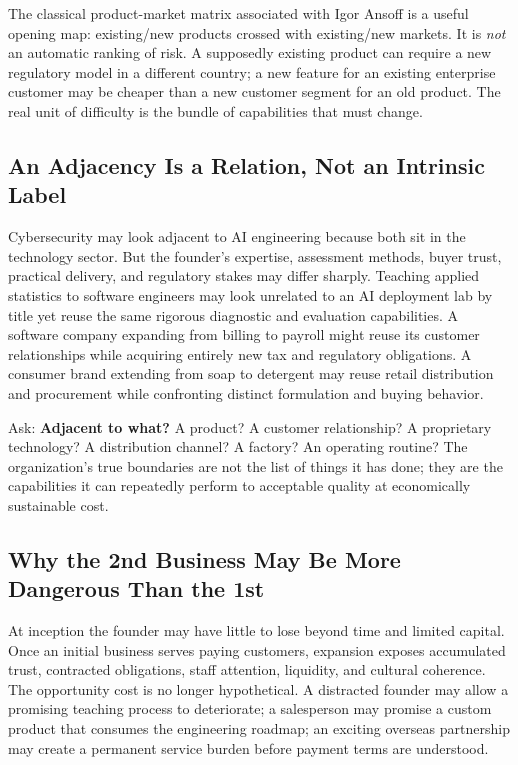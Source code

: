 The classical product-market matrix associated with Igor Ansoff is a useful opening map: existing/new products crossed with existing/new markets. It is \textit{not} an automatic ranking of risk. A supposedly existing product can require a new regulatory model in a different country; a new feature for an existing enterprise customer may be cheaper than a new customer segment for an old product. The real unit of difficulty is the bundle of capabilities that must change.

\subsection{An Adjacency Is a Relation, Not an Intrinsic Label}
\label{sec:adjacency_is_a_relation}

Cybersecurity may look adjacent to AI engineering because both sit in the technology sector. But the founder's expertise, assessment methods, buyer trust, practical delivery, and regulatory stakes may differ sharply. Teaching applied statistics to software engineers may look unrelated to an AI deployment lab by title yet reuse the same rigorous diagnostic and evaluation capabilities. A software company expanding from billing to payroll might reuse its customer relationships while acquiring entirely new tax and regulatory obligations. A consumer brand extending from soap to detergent may reuse retail distribution and procurement while confronting distinct formulation and buying behavior.

Ask: \textbf{Adjacent to what?} A product? A customer relationship? A proprietary technology? A distribution channel? A factory? An operating routine? The organization's true boundaries are not the list of things it has done; they are the capabilities it can repeatedly perform to acceptable quality at economically sustainable cost.

\subsection{Why the 2nd Business May Be More Dangerous Than the 1st}
\label{sec:why_second_business_more_dangerous}

At inception the founder may have little to lose beyond time and limited capital. Once an initial business serves paying customers, expansion exposes accumulated trust, contracted obligations, staff attention, liquidity, and cultural coherence. The opportunity cost is no longer hypothetical. A distracted founder may allow a promising teaching process to deteriorate; a salesperson may promise a custom product that consumes the engineering roadmap; an exciting overseas partnership may create a permanent service burden before payment terms are understood.

